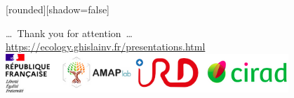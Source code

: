 \documentclass[10pt,table,dvipsnames,compress]{beamer}
\begin{document}
{
  [rounded][shadow=false]
  \begin{frame}[plain]
    \begin{block}{}
      \begin{center}
        \ldots~Thank you for attention~\ldots \\
        \url{https://ecology.ghislainv.fr/presentations.html} \\
        \includegraphics[width=0.8\textwidth]{figs/partners_logos}
      \end{center}
    \end{block}
  \end{frame}
}
\end{document}
